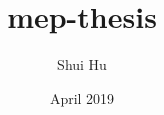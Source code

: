 \documentclass[11pt, a4paper, twoside, titlepage, usenames,dvipsnames]{report}
\title{mep-thesis}
\author{Shui Hu}
\date{April 2019}
\begin{document}


\tableofcontents

%










%

\begin{appendices}
  
\end{appendices}




\end{document}
